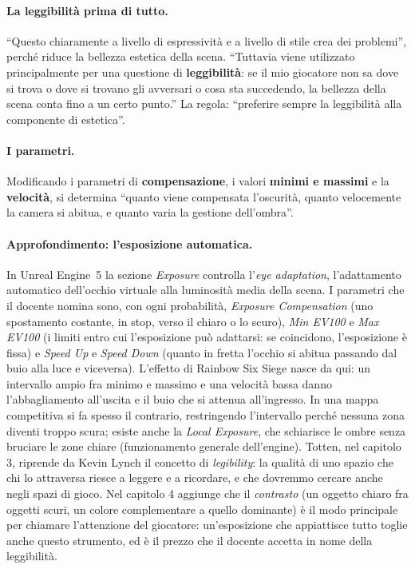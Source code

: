 \paragraph{La leggibilità prima di tutto.} ``Questo chiaramente a livello di espressività e a
livello di stile crea dei problemi'', perché riduce la bellezza estetica della scena.
``Tuttavia viene utilizzato principalmente per una questione di \textbf{leggibilità}: se il mio
giocatore non sa dove si trova o dove si trovano gli avversari o cosa sta succedendo, la
bellezza della scena conta fino a un certo punto.'' La regola: ``preferire sempre la
leggibilità alla componente di estetica''.

\paragraph{I parametri.} Modificando i parametri di \textbf{compensazione}, i valori
\textbf{minimi e massimi} e la \textbf{velocità}, si determina ``quanto viene compensata
l'oscurità, quanto velocemente la camera si abitua, e quanto varia la gestione dell'ombra''.

\paragraph{Approfondimento: l'esposizione automatica.} In Unreal Engine~5 la sezione
\emph{Exposure} controlla l'\emph{eye adaptation}, l'adattamento automatico dell'occhio
virtuale alla luminosità media della scena. I parametri che il docente nomina sono, con ogni
probabilità, \emph{Exposure Compensation} (uno spostamento costante, in stop, verso il chiaro
o lo scuro), \emph{Min EV100} e \emph{Max EV100} (i limiti entro cui l'esposizione può
adattarsi: se coincidono, l'esposizione è fissa) e \emph{Speed Up} e \emph{Speed Down} (quanto
in fretta l'occhio si abitua passando dal buio alla luce e viceversa). L'effetto di Rainbow Six
Siege nasce da qui: un intervallo ampio fra minimo e massimo e una velocità bassa danno
l'abbagliamento all'uscita e il buio che si attenua all'ingresso. In una mappa competitiva si
fa spesso il contrario, restringendo l'intervallo perché nessuna zona diventi troppo scura;
esiste anche la \emph{Local Exposure}, che schiarisce le ombre senza bruciare le zone chiare
(funzionamento generale dell'engine). Totten, nel capitolo 3, riprende da Kevin Lynch il
concetto di \emph{legibility}: la qualità di uno spazio che chi lo attraversa riesce a
leggere e a ricordare, e che dovremmo cercare anche negli spazi di gioco. Nel capitolo 4
aggiunge che il \emph{contrasto} (un oggetto chiaro fra oggetti scuri, un colore
complementare a quello dominante) è il modo principale per chiamare l'attenzione del
giocatore: un'esposizione che appiattisce tutto toglie anche questo strumento, ed è il prezzo
che il docente accetta in nome della leggibilità.

